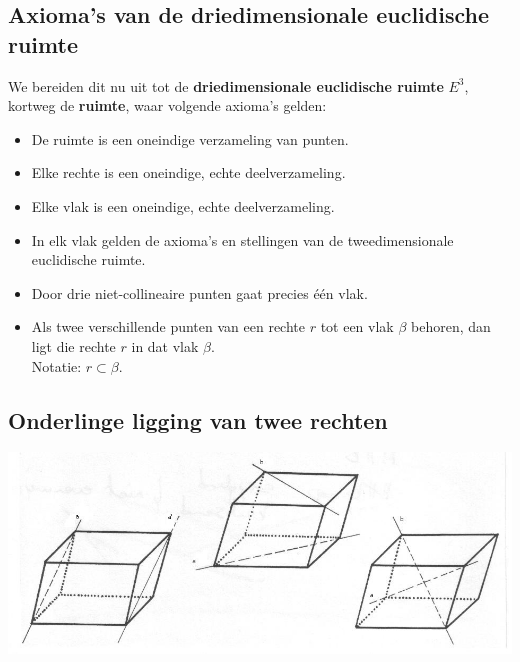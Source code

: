 \documentclass[12pt,twoside]{article}
\begin{document}
\begin{theorie}
\subsection{Axioma's van de driedimensionale euclidische ruimte}

We bereiden dit nu uit tot de {\bf driedimensionale euclidische ruimte} $E^3$, kortweg de {\bf ruimte}, waar volgende axioma's gelden:
\begin{itemize}
  \item De ruimte is een oneindige verzameling van punten.
  \item Elke rechte is een oneindige, echte deelverzameling.
  \item Elke vlak is een oneindige, echte deelverzameling.
  \item In elk vlak gelden de axioma's en stellingen van de tweedimensionale euclidische ruimte.
  \item Door drie niet-collineaire punten gaat precies één vlak.
  \item Als twee verschillende punten van een rechte $r$ tot een vlak $\beta$ behoren, dan ligt die rechte $r$ in dat vlak $\beta$.\\
  Notatie: $r\subset\beta$.
\end{itemize}

\subsection{Onderlinge ligging van twee rechten}

\begin{center}
  \includegraphics[width=\textwidth]{onderlinge_ligging_twee_rechten}
\end{center}


\end{theorie}
\end{document}
